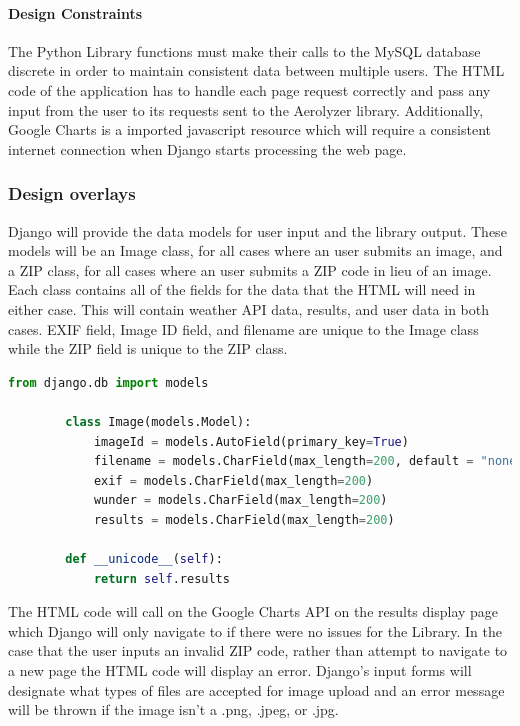 \documentclass[onecolumn, draftclsnofoot,10pt, compsoc]{IEEEtran}
\begin{document}
\begin{singlespace}
          \paragraph{Design Constraints}
          The Python Library functions must make their calls to the MySQL database discrete in order to maintain consistent data between multiple users.
          The HTML code of the application has to handle each page request correctly and pass any input from the user to its requests sent to the Aerolyzer library. 
          Additionally, Google Charts is a imported javascript resource which will require a consistent internet connection when Django starts processing the web page.
      \subsubsection{Design overlays}
      Django will provide the data models for user input and the library output.
      These models will be an Image class, for all cases where an user submits an image, and a ZIP class, for all cases where an user submits a ZIP code in lieu of an image.
	  Each class contains all of the fields for the data that the HTML will need in either case. This will contain weather API data, results, and user data in both cases.
	  EXIF field, Image ID field, and filename are unique to the Image class while the ZIP field is unique to the ZIP class. 
		\begin{lstlisting}[language=Python]
        from django.db import models
        
        class Image(models.Model):
            imageId = models.AutoField(primary_key=True)
            filename = models.CharField(max_length=200, default = "none")
            exif = models.CharField(max_length=200)
            wunder = models.CharField(max_length=200)
            results = models.CharField(max_length=200)
            
        def __unicode__(self):
            return self.results
			\end{lstlisting}
            The HTML code will call on the Google Charts API on the results display page which Django will only navigate to if there were no issues for the Library.
			In the case that the user inputs an invalid ZIP code, rather than attempt to navigate to a new page the HTML code will display an error.
			Django’s input forms will designate what types of files are accepted for image upload and an error message will be thrown if the image isn’t a .png, .jpeg, or .jpg.
			

\end{singlespace}
\end{document}
